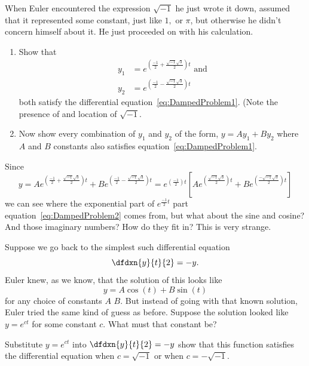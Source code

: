 When Euler encountered the expression $\sqrt{-1}$ he just wrote it
down, assumed that it represented some constant, just like $1,$ or $\pi$,
but otherwise he didn't concern himself about it. He just proceeded on
with his calculation.

\begin{embeddedproblem}{}
  \begin{enumerate}[label={\bf{}(\alph*)}]
      \item   Show that
        \begin{align}
\label{eq:DampedProblem2}          y_1&=e^{(\frac{-1}{2}+\frac{\sqrt{-1}\sqrt{3}}{2})t}\text{ and}\\
\nonumber          y_2&=e^{(\frac{-1}{2}-\frac{\sqrt{-1}\sqrt{3}}{2})t}
        \end{align}
        both satisfy  the differential
        equation~\ref{eq:DampedProblem1}. (Note the presence of and
        location of $\sqrt{-1}.$
        \item Now show every combination of $y_1$ and $y_2$ of the
          form, $y=Ay_1+By_2$ where  $A$ and $B$  constants also
          satisfies equation~\ref{eq:DampedProblem1}.
  \end{enumerate}
\end{embeddedproblem} 

Since
$$
y=Ae^{\left(\frac{-1}{2}+\frac{\sqrt{-1}\sqrt{3}}{2}\right)t}+Be^{\left(\frac{-1}{2}-\frac{\sqrt{-1}\sqrt{3}}{2}\right)t}
= e^{\left(\frac{-1}{2}\right)t}\left[Ae^{\left(\frac{\sqrt{-1}\sqrt{3}}{2}\right)t}+Be^{\left(\frac{-\sqrt{-1}\sqrt{3}}{2}\right)t}\right]
$$
we  can see where the exponential part of  $e^{\frac{-1}{2}t}$ part
equation~\ref{eq:DampedProblem2} comes from, but what about the sine
and cosine? And those imaginary numbers? How do they fit in? This is
very strange.

Suppose we go back to the simplest such differential equation
$$ \dfdxn{y}{t}{2}=-y.
$$
Euler knew, as we know, that the solution of this looks like
$$
y=A\cos(t)+B\sin(t)
$$
for any choice of constants $A$ $B.$ But instead of going with that
known solution, Euler tried the same kind of guess as before.  Suppose
the solution looked like $y=e^{ct}$ for some constant $c.$ What must
that constant be?

\begin{embeddedproblem}{}
  Substitute $y=e^{ct}$ into $\dfdxn{y}{t}{2}=-y$ show that this
  function satisfies the differential equation when $c=\sqrt{-1}$
  or when $c=-\sqrt{-1}.$
\end{embeddedproblem}

